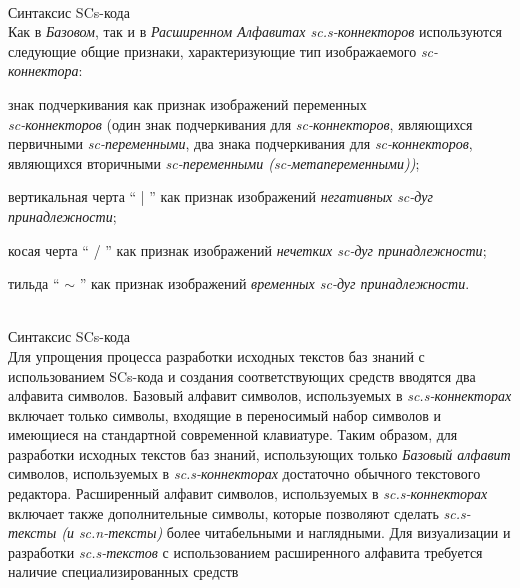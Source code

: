 \begin{frame}{\\Синтаксис SCs-кода}
	\topline
	\justifying
	\vspace*{\fill}\\
	Как в \textit{Базовом}, так и в \textit{Расширенном Алфавитах sc.s-коннекторов} используются следующие общие признаки, характеризующие тип изображаемого \textit{sc-коннектора}:
	\begin{textitemize}
		\item знак подчеркивания как признак изображений  переменных \\ \textit{sc-коннекторов} (один знак подчеркивания для \textit{sc-коннекторов}, являющихся первичными \textit{sc-переменными}, два знака подчеркивания для \textit{sc-коннекторов}, являющихся вторичными \textit{sc-переменными (sc-метапеременными))};
		\item вертикальная черта “ | ” как признак изображений \textit{негативных sc-дуг принадлежности};
		\item косая черта “ / ” как признак изображений \textit{нечетких sc-дуг принадлежности};
		\item тильда “ $\sim$ ” как признак изображений \textit{временных sc-дуг принадлежности}.
	\end{textitemize}
\end{frame}

\begin{frame}{\\Синтаксис SCs-кода}
	\topline
	\justifying
	\vspace*{\fill}\\
	Для упрощения процесса разработки исходных текстов баз знаний с использованием SCs-кода и создания соответствующих средств вводятся два алфавита символов. Базовый алфавит символов, используемых в \textit{sc.s-коннекторах} включает только символы, входящие в переносимый набор символов и имеющиеся на стандартной современной клавиатуре. Таким образом, для разработки исходных текстов баз знаний, использующих только \textit{Базовый алфавит} символов, используемых в \textit{sc.s-коннекторах} достаточно обычного текстового редактора. Расширенный алфавит символов, используемых в \textit{sc.s-коннекторах} включает также дополнительные символы, которые позволяют сделать \textit{sc.s-тексты (и sc.n-тексты)} более читабельными и наглядными. Для визуализации и разработки \textit{sc.s-текстов} с использованием расширенного алфавита требуется наличие специализированных средств
\end{frame}


